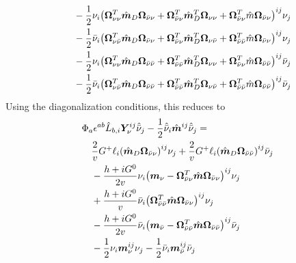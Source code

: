 \documentclass[a4paper,11pt]{article} \pdfoutput=1
\newcommand{\rhn}{\bar{\nu}}
\newcommand{\OmegaVVb}{\bm{\Omega}_{\nu\nu}}
\newcommand{\OmegaVNb}{\bm{\Omega}_{\nu\rhn}}
\newcommand{\OmegaNVb}{\bm{\Omega}_{\rhn\nu}}
\newcommand{\OmegaNNb}{\bm{\Omega}_{\rhn\rhn}}
\begin{document}
\begin{align}
	 & \quad
	- \frac{1}{2}\nu_i\qty(
	\OmegaVVb^{T}\hat{\bm{m}}_{D}\OmegaNVb +
	\OmegaNVb^{T}\hat{\bm{m}}^{T}_{D}\OmegaVVb +
	\OmegaNVb^{T}\hat{m}\OmegaNVb
	)^{ij}\nu_{j}
	\notag                                                               \\
	 & \quad
	- \frac{1}{2}\rhn_i\qty(
	\OmegaVNb^{T}\hat{\bm{m}}_{D}\OmegaNVb +
	\OmegaNVb^{T}\hat{\bm{m}}^{T}_{D}\OmegaVNb +
	\OmegaNNb^{T}\hat{m}\OmegaNVb
	)^{ij}\nu_{j}
	\notag                                                               \\
	 & \quad
	- \frac{1}{2}\nu_i\qty(
	\OmegaVVb^{T}\hat{\bm{m}}_{D}\OmegaNNb +
	\OmegaNNb^{T}\hat{\bm{m}}^{T}_{D}\OmegaVVb +
	\OmegaNVb^{T}\hat{m}\OmegaNNb
	)^{ij}\rhn_{j}
	\notag                                                               \\
	 & \quad
	- \frac{1}{2}\rhn_i\qty(
	\OmegaVNb^{T}\hat{\bm{m}}_{D}\OmegaNNb +
	\OmegaNNb^{T}\hat{\bm{m}}^{T}_{D}\OmegaVNb +
	\OmegaNNb^{T}\hat{m}\OmegaNNb
	)^{ij}\rhn_{j} \notag
\end{align}
Using the diagonalization conditions, this reduces to
\begin{align}
	 & \Phi_{a}\epsilon^{ab}\hat{L}_{b,i}\bm{Y}^{ij}_{\nu}\hat{\rhn}_{j}
	- \frac{1}{2}\hat{\rhn}_i\hat{\bm{m}}^{ij}\hat{\rhn}_j=              \\
	 & \quad
	\frac{2}{v}G^{+}\ell_{i}\qty(\hat{\bm{m}}_{D}\OmegaNVb)^{ij}\nu_{j}
	+ \frac{2}{v}G^{+}\ell_{i}\qty(\hat{\bm{m}}_{D}\OmegaNNb)^{ij}\rhn_{j}
	\notag                                                               \\
	 & \quad
	- \frac{h+iG^{0}}{2v}\nu_i\qty(
	\bm{m}_{\nu}
	-\OmegaNVb^{T}\hat{\bm{m}}\OmegaNVb
	)^{ij}\nu_{j}
	\notag                                                               \\
	 & \quad
	+ \frac{h+iG^{0}}{v}\rhn_i\qty(
	\OmegaNNb^{T}\hat{\bm{m}}\OmegaNVb
	)^{ij}\nu_{j}
	\notag                                                               \\
	 & \quad
	- \frac{h+iG^{0}}{2v}\rhn_i\qty(
	\bm{m}_{\rhn}
	-\OmegaNNb^{T}\hat{\bm{m}}\OmegaNNb
	)^{ij}\rhn_{j}
	\notag                                                               \\
	 & \quad
	- \frac{1}{2}\nu_i\bm{m}_{\nu}^{ij}\nu_{j}
	- \frac{1}{2}\rhn_i\bm{m}_{\rhn}^{ij}\rhn_{j} \notag
	\notag
\end{align}
\end{document}
